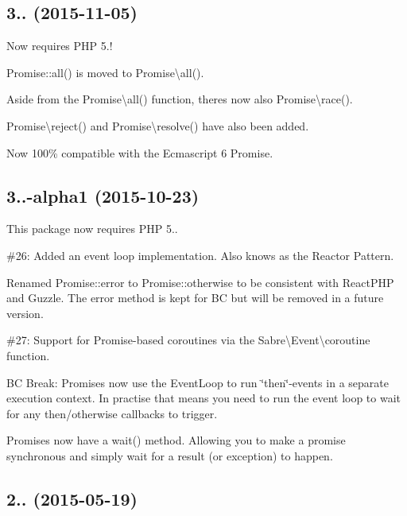 \subsection*{3.. (2015-\/11-\/05) }


\begin{DoxyItemize}
\item Now requires P\+HP 5.!
\item {\ttfamily Promise\+::all()} is moved to {\ttfamily Promise\textbackslash{}all()}.
\item Aside from the {\ttfamily Promise\textbackslash{}all()} function, there\textquotesingle{}s now also {\ttfamily Promise\textbackslash{}race()}.
\item {\ttfamily Promise\textbackslash{}reject()} and {\ttfamily Promise\textbackslash{}resolve()} have also been added.
\item Now 100\% compatible with the Ecmascript 6 Promise.
\end{DoxyItemize}

\subsection*{3..-\/alpha1 (2015-\/10-\/23) }


\begin{DoxyItemize}
\item This package now requires P\+HP 5..
\item \#26\+: Added an event loop implementation. Also knows as the Reactor Pattern.
\item Renamed {\ttfamily Promise\+::error} to {\ttfamily Promise\+::otherwise} to be consistent with React\+P\+HP and Guzzle. The {\ttfamily error} method is kept for BC but will be removed in a future version.
\item \#27\+: Support for Promise-\/based coroutines via the {\ttfamily Sabre\textbackslash{}Event\textbackslash{}coroutine} function.
\item BC Break\+: Promises now use the Event\+Loop to run \char`\"{}then\char`\"{}-\/events in a separate execution context. In practise that means you need to run the event loop to wait for any {\ttfamily then}/{\ttfamily otherwise} callbacks to trigger.
\item Promises now have a {\ttfamily wait()} method. Allowing you to make a promise synchronous and simply wait for a result (or exception) to happen.
\end{DoxyItemize}

\subsection*{2.. (2015-\/05-\/19) }


